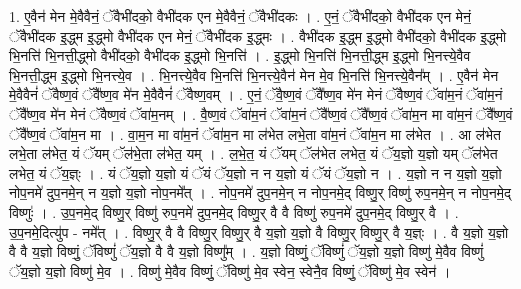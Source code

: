 \documentclass[17pt]{extarticle}
\begin{document}
1. ए॒वैन॑ मेन मे॒वैवैनं॒ ॅवैभी॑दको॒ वैभी॑दक एन मे॒वैवैनं॒ ॅवैभी॑दकः । . ए॒नं॒ ॅवैभी॑दको॒ वैभी॑दक एन मेनं॒ ॅवैभी॑दक इ॒द्ध्म इ॒द्ध्मो वैभी॑दक एन मेनं॒ ॅवैभी॑दक इ॒द्ध्मः । . वैभी॑दक इ॒द्ध्म इ॒द्ध्मो वैभी॑दको॒ वैभी॑दक इ॒द्ध्मो भि॒नत्ति॑ भि॒नत्ती॒द्ध्मो वैभी॑दको॒ वैभी॑दक इ॒द्ध्मो भि॒नत्ति॑ । . इ॒द्ध्मो भि॒नत्ति॑ भि॒नत्ती॒द्ध्म इ॒द्ध्मो भि॒नत्त्ये॒वैव भि॒नत्ती॒द्ध्म इ॒द्ध्मो भि॒नत्त्ये॒व । . भि॒नत्त्ये॒वैव भि॒नत्ति॑ भि॒नत्त्ये॒वैन॑ मेन मे॒व भि॒नत्ति॑ भि॒नत्त्ये॒वैन᳚म् । . ए॒वैन॑ मेन मे॒वैवैनं॑ ॅवैष्ण॒वं ॅवै᳚ष्ण॒व मे॑न मे॒वैवैनं॑ ॅवैष्ण॒वम् । . ए॒नं॒ ॅवै॒ष्ण॒वं ॅवै᳚ष्ण॒व मे॑न मेनं ॅवैष्ण॒वं ॅवा॑म॒नं ॅवा॑म॒नं ॅवै᳚ष्ण॒व मे॑न मेनं ॅवैष्ण॒वं ॅवा॑म॒नम् । . वै॒ष्ण॒वं ॅवा॑म॒नं ॅवा॑म॒नं ॅवै᳚ष्ण॒वं ॅवै᳚ष्ण॒वं ॅवा॑म॒न मा वा॑म॒नं ॅवै᳚ष्ण॒वं ॅवै᳚ष्ण॒वं ॅवा॑म॒न मा । . वा॒म॒न मा वा॑म॒नं ॅवा॑म॒न मा ल॑भेत लभे॒ता वा॑म॒नं ॅवा॑म॒न मा ल॑भेत । . आ ल॑भेत लभे॒ता ल॑भेत॒ यं ॅयम् ॅल॑भे॒ता ल॑भेत॒ यम् । . ल॒भे॒त॒ यं ॅयम् ॅल॑भेत लभेत॒ यं ॅय॒ज्ञो य॒ज्ञो यम् ॅल॑भेत लभेत॒ यं ॅय॒ज्ञ्ः । . यं ॅय॒ज्ञो य॒ज्ञो यं ॅयं ॅय॒ज्ञो न न य॒ज्ञो यं ॅयं ॅय॒ज्ञो न । . य॒ज्ञो न न य॒ज्ञो य॒ज्ञो नोप॒नमे॑ दुप॒नमे॒न् न य॒ज्ञो य॒ज्ञो नोप॒नमे᳚त् । . नोप॒नमे॑ दुप॒नमे॒न् न नोप॒नमे॒द् विष्णु॒र् विष्णु॑ रुप॒नमे॒न् न नोप॒नमे॒द् विष्णुः॑ । . उ॒प॒नमे॒द् विष्णु॒र् विष्णु॑ रुप॒नमे॑ दुप॒नमे॒द् विष्णु॒र् वै वै विष्णु॑ रुप॒नमे॑ दुप॒नमे॒द् विष्णु॒र् वै । . उ॒प॒नमे॒दित्यु॑प - नमे᳚त् । . विष्णु॒र् वै वै विष्णु॒र् विष्णु॒र् वै य॒ज्ञो य॒ज्ञो वै विष्णु॒र् विष्णु॒र् वै य॒ज्ञ्ः । . वै य॒ज्ञो य॒ज्ञो वै वै य॒ज्ञो विष्णुं॒ ॅविष्णुं॑ ॅय॒ज्ञो वै वै य॒ज्ञो विष्णु᳚म् । . य॒ज्ञो विष्णुं॒ ॅविष्णुं॑ ॅय॒ज्ञो य॒ज्ञो विष्णु॑ मे॒वैव विष्णुं॑ ॅय॒ज्ञो य॒ज्ञो विष्णु॑ मे॒व । . विष्णु॑ मे॒वैव विष्णुं॒ ॅविष्णु॑ मे॒व स्वेन॒ स्वेनै॒व विष्णुं॒ ॅविष्णु॑ मे॒व स्वेन॑ । \newline
\end{document}
